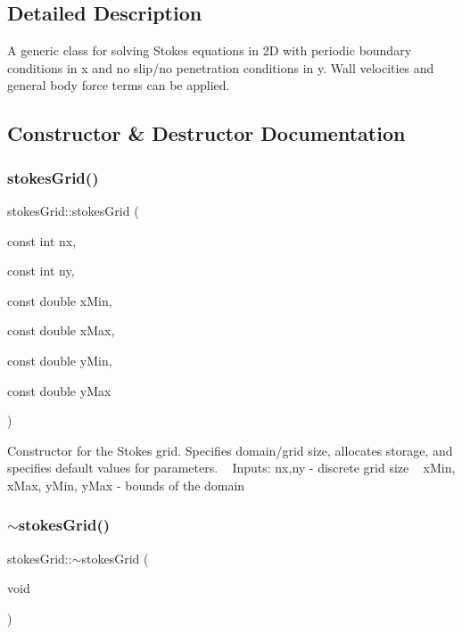\subsection{Detailed Description}
A generic class for solving Stokes equations in 2D with periodic boundary conditions in x and no slip/no penetration conditions in y. Wall velocities and general body force terms can be applied. 

\subsection{Constructor \& Destructor Documentation}
\mbox{\label{classstokesGrid_a9c6ba1544914f9b796e308982c6850b6}} 
\subsubsection{\texorpdfstring{stokes\+Grid()}{stokesGrid()}}
{\footnotesize\ttfamily stokes\+Grid\+::stokes\+Grid (\begin{DoxyParamCaption}\item[{const int}]{nx,  }\item[{const int}]{ny,  }\item[{const double}]{x\+Min,  }\item[{const double}]{x\+Max,  }\item[{const double}]{y\+Min,  }\item[{const double}]{y\+Max }\end{DoxyParamCaption})}

Constructor for the Stokes grid. Specifies domain/grid size, allocates storage, and specifies default values for parameters. ~\newline
Inputs\+: nx,ny -\/ discrete grid size ~\newline
x\+Min, x\+Max, y\+Min, y\+Max -\/ bounds of the domain ~\newline
\mbox{\label{classstokesGrid_a8cd3d5ec2336e61ce71253e40d7b3560}} 
\subsubsection{\texorpdfstring{$\sim$stokes\+Grid()}{~stokesGrid()}}
{\footnotesize\ttfamily stokes\+Grid\+::$\sim$stokes\+Grid (\begin{DoxyParamCaption}\item[{void}]{ }\end{DoxyParamCaption})}

